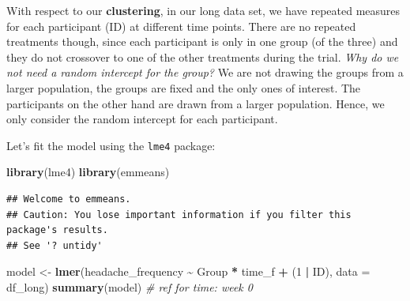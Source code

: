 \documentclass[
]{book}
\newenvironment{Shaded}{\begin{snugshade}}{\end{snugshade}}
\newcommand{\AttributeTok}[1]{\textcolor[rgb]{0.13,0.29,0.53}{#1}}
\newcommand{\CommentTok}[1]{\textcolor[rgb]{0.56,0.35,0.01}{\textit{#1}}}
\newcommand{\DecValTok}[1]{\textcolor[rgb]{0.00,0.00,0.81}{#1}}
\newcommand{\FunctionTok}[1]{\textcolor[rgb]{0.13,0.29,0.53}{\textbf{#1}}}
\newcommand{\NormalTok}[1]{#1}
\newcommand{\OtherTok}[1]{\textcolor[rgb]{0.56,0.35,0.01}{#1}}
\newcommand{\SpecialCharTok}[1]{\textcolor[rgb]{0.81,0.36,0.00}{\textbf{#1}}}
\begin{document}
With respect to our \textbf{clustering}, in our long data set,
we have repeated measures for each participant (ID) at different time points.
There are no repeated treatments though, since each participant
is only in one group (of the three) and they do not crossover to
one of the other treatments during the trial.
\emph{Why do we not need a random intercept for the group?}
We are not drawing the groups from a larger population,
the groups are fixed and the only ones of interest.
The participants on the other hand are
drawn from a larger population.
Hence, we only consider the random intercept for each participant.

Let's fit the model using the \texttt{lme4} package:

\begin{Shaded}
\begin{Highlighting}[]
\FunctionTok{library}\NormalTok{(lme4)}
\FunctionTok{library}\NormalTok{(emmeans)}
\end{Highlighting}
\end{Shaded}

\begin{verbatim}
## Welcome to emmeans.
## Caution: You lose important information if you filter this package's results.
## See '? untidy'
\end{verbatim}

\begin{Shaded}
\begin{Highlighting}[]
\NormalTok{model }\OtherTok{\textless{}{-}} \FunctionTok{lmer}\NormalTok{(headache\_frequency }\SpecialCharTok{\textasciitilde{}}\NormalTok{ Group }\SpecialCharTok{*}\NormalTok{ time\_f }\SpecialCharTok{+}\NormalTok{ (}\DecValTok{1} \SpecialCharTok{|}\NormalTok{ ID),}
              \AttributeTok{data =}\NormalTok{ df\_long)}
\FunctionTok{summary}\NormalTok{(model) }\CommentTok{\# ref for time: week 0}
\end{Highlighting}
\end{Shaded}
\end{document}
